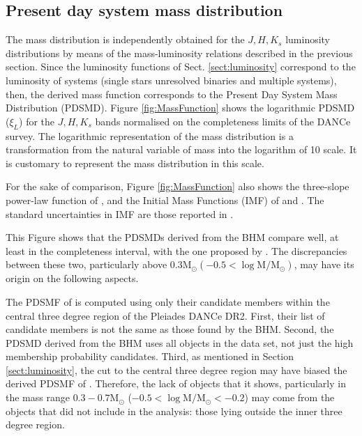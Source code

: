 \subsection{Present day system mass distribution}

The mass distribution is independently obtained for the $J,H,K_s$ luminosity distributions by means of the mass-luminosity relations described in the previous section. Since the luminosity functions of Sect. \ref{sect:luminosity} correspond to the luminosity of systems (single stars unresolved binaries and multiple systems), then, the derived mass function corresponds to the Present Day System Mass Distribution (PDSMD).  Figure \ref{fig:MassFunction} shows the logarithmic PDSMD ($\xi_L$) for the $J,H,K_s$ bands normalised on the completeness limits of the DANCe survey. The logarithmic representation of the mass distribution is a transformation from the natural variable of mass into the logarithm of 10 scale. It is customary to represent the mass distribution in this scale.

For the sake of comparison, Figure \ref{fig:MassFunction} also shows the three-slope power-law function of \citet{Bouy2015}, and the Initial Mass Functions (IMF) of \citet{Thies2007} and \citet{Chabrier2005}. The standard uncertainties in \citet{Chabrier2005} IMF are those reported in \citet{Chabrier2003}. 

This Figure shows that the PDSMDs derived from the BHM compare well, at least in the completeness interval, with the one proposed by \citet{Bouy2015}. The discrepancies between these two, particularly above $0.3 \mathrm{M_{\odot}} (-0.5 < \log \mathrm{M/M_{\odot}})$, may have its origin on the following aspects.

The PDSMF of \citet{Bouy2015} is computed using only their candidate members within the central three degree region of the Pleiades DANCe DR2. First, their list of candidate members is not the same as those found by the BHM. Second, the PDSMD derived from the BHM uses all objects in the data set, not just the high membership probability candidates. Third, as mentioned in Section \ref{sect:luminosity}, the cut to the central three degree region may have biased the derived PDSMF of \citet{Bouy2015}. Therefore, the lack of objects that it shows, particularly in the mass range $0.3 - 0.7 \mathrm{M_{\odot}}$ ($-0.5 < \log \mathrm{M/M_{\odot}} < -0.2$) may come from the objects that \citet{Bouy2015} did not include in the analysis: those lying outside the inner three degree region. 

